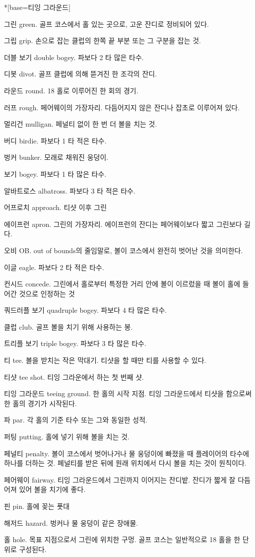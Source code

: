 \documentclass[10pt, openright, language=korean]{hzguide}
\newcommand\PrintIndex{\backmatter\printindex}
\newcommand\PrintIndex{}
\begin{document}
\begin{terms}*[base={티잉 그라운드}]
\item[그린] green. 골프 코스에서 홀 있는 곳으로, 고운 잔디로 정비되어 있다.
\item[그립] grip. 손으로 잡는 클럽의 한쪽 끝 부분 또는 그 구분을 잡는 것.
\item[더블 보기] double bogey. 파보다 2 타 많은 타수.
\item[디봇] divot. 골프 클럽에 의해 뜯겨진 한 조각의 잔디.
\item[라운드] round. 18 홀로 이루어진 한 회의 경기.
\item[러프] rough. 페어웨이의 가장자리. 다듬어지지 않은 잔디나 잡초로 이루어져 있다.
\item[멀리건] mulligan. 페널티 없이 한 번 더 볼을 치는 것.
\item[버디] birdie. 파보다 1 타 적은 타수.
\item[벙커] bunker. 모래로 채워진 웅덩이.
\item[보기] bogey. 파보다 1 타 많은 타수.
\item[알바트로스] albatross. 파보다 3 타 적은 타수.
\item[어프로치] approach. 티샷 이후 그린
\item[에이프런] apron. 그린의 가장자리. 에이프런의 잔디는 페어웨이보다 짧고 그린보다 길다.
\item[오비] OB. out of bounds의 줄임말로, 볼이 코스에서 완전히 벗어난 것을 의미한다.
\item[이글] eagle. 파보다 2 타 적은 타수.
\item[컨시드] concede. 그린에서 홀로부터 특정한 거리 안에 볼이 이르렀을 때 볼이 홀에 들어간 것으로 인정하는 것
\item[쿼드러플 보기] quadruple bogey. 파보다 4 타 많은 타수.
\item[클럽] club. 골프 볼을 치기 위해 사용하는 봉.
\item[트리플 보기] triple bogey. 파보다 3 타 많은 타수.
\item[티] tee. 볼을 받치는 작은 막대기. 티샷을 할 때만 티를 사용할 수 있다.
\item[티샷] tee shot. 티잉 그라운에서 하는 첫 번째 샷.
\item[티잉 그라운드] teeing ground. 한 홀의 시작 지점. 티잉 그라운드에서 티샷을 함으로써 한 홀의 경기가 시작된다.
\item[파] par. 각 홀의 기준 타수 또는 그와 동일한 성적.
\item[퍼팅] putting. 홀에 넣기 위해 볼을 치는 것.
\item[페널티] penalty. 볼이 코스에서 벗어나거나 물 웅덩이에 빠졌을 때 플레이어의 타수에 하나를 더하는 것. 페널티를 받은 뒤에 원래 위치에서 다시 볼을 치는 것이 원칙이다.
\item[페어웨이] fairway. 티잉 그라운드에서 그린까지 이어지는 잔디밭. 잔디가 짧게 잘 다듬어져 있어 볼을 치기에 좋다.
\item[핀] pin. 홀에 꽂는 푯대
\item[해저드] hazard. 벙커나 물 웅덩이 같은 장애물.
\item[홀] hole. 목표 지점으로서 그린에 위치한 구멍. 골프 코스는 일반적으로 18 홀을 한 단위로 구성된다.
\end{terms}

\PrintIndex

\BackCover
\end{document}
